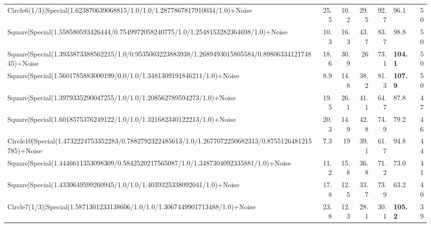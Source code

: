 \begin{tabular}{lrrrrlr}
 Circle6(1/3)|Special(1.623870639068815/1.0/1.0/1.2877867817910034/1.0)+Noise                                                  &            25.5 &           10.2 &            29.5 &            92.7 & 96.1            &           50 \\
 Square|Special(1.558580593426444/0.7549972058240775/1.0/1.2548153282364698/1.0)+Noise                                         &            10.3 &           16.3 &            43.7 &            83.7 & 98.8            &           50 \\
 Square|Special(1.3933873388562215/1.0/0.9535003223883938/1.2689493015805584/0.8980633412174845)+Noise                         &            18.6 &           30.9 &            26   &            73.1 & \textbf{104.1}  &           50 \\
 Square|Special(1.5601785883000199/0.0/1.0/1.3481309191846211/1.0)+Noise                                                       &             8.9 &           14.8 &            38.2 &            81.3 & \textbf{107.9}  &           50 \\
 Square|Special(1.3979335290047255/1.0/1.0/1.208562789594273/1.0)+Noise                                                        &            19.5 &           26.1 &            41.1 &            64.7 & 87.8            &           47 \\
 Square|Special(1.6018575376249122/1.0/1.0/1.321682340122213/1.0)+Noise                                                        &            20.3 &           14.9 &            42.8 &            74.9 & 79.2            &           46 \\
 Circle10|Special(1.4732224753352283/0.7882792322485613/1.0/1.2677072250682313/0.8755126481215785)+Noise                       &             7.3 &           19   &            39.1 &            61.7 & 94.8            &           44 \\
 Square|Special(1.4446611353098309/0.5842520217565087/1.0/1.3487304092335881/1.0)+Noise                                        &            11.2 &           15.8 &            36.8 &            71.2 & 73.0            &           41 \\
 Square|Special(1.4330649599260945/1.0/1.0/1.4039325338092041/1.0)+Noise                                                       &            17.8 &           12.5 &            33.7 &            73.9 & 63.2            &           40 \\
 Circle7(1/3)|Special(1.5871301233138606/1.0/1.0/1.3067449901713488/1.0)+Noise                                                 &            23.8 &           12.3 &            28.1 &            30.1 & \textbf{105.2}  &           39 \\

\end{tabular}
